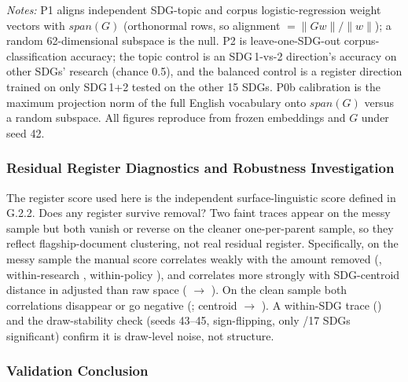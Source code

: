 \documentclass[12pt,a4paper]{article}
\begin{document}
\begin{table}[ht]
\centering
\small
\caption{Direction-space characterisation of the removed subspace $G$ (MPNet canon).}
\label{tab:register-subspace}
\resizebox{\textwidth}{!}{}
\par\smallskip\footnotesize\emph{Notes:} P1 aligns independent SDG-topic and corpus logistic-regression weight vectors with $span(G)$ (orthonormal rows, so alignment $=\lVert Gw\rVert/\lVert w\rVert$); a random 62-dimensional subspace is the null. P2 is leave-one-SDG-out corpus-classification accuracy; the topic control is an SDG\,1-vs-2 direction's accuracy on other SDGs' research (chance 0.5), and the balanced control is a register direction trained on only SDG\,1+2 tested on the other 15 SDGs. P0b calibration is the maximum projection norm of the full English vocabulary onto $span(G)$ versus a random subspace. All figures reproduce from frozen embeddings and $G$ under seed 42.\par
\end{table}

\subsubsection{Residual Register Diagnostics and Robustness Investigation}
\label{sec:regval-residual}

The register score used here is the independent surface-linguistic score defined in G.2.2. Does any register survive removal? Two faint traces appear on the messy sample but both vanish or reverse on the cleaner one-per-parent sample, so they reflect flagship-document clustering, not real residual register. Specifically, on the messy sample the manual score correlates weakly with the amount removed (\RegValTwoBOrigPooled{}, within-research \RegValTwoBOrigWithinRes{}, within-policy \RegValTwoBOrigWithinPol{}), and correlates more strongly with SDG-centroid distance in adjusted than raw space (\RegValTwoCOrigRaw{} $\to$ \RegValTwoCOrigAdj{}). On the clean sample both correlations disappear or go negative (\RegValTwoBOppPooled{}; centroid \RegValTwoCOppRaw{} $\to$ \RegValTwoCOppAdj{}). A within-SDG trace (\RegValOtherDistRho{}) and the draw-stability check (seeds 43--45, sign-flipping, only \RegValPerSdgSig{}/17 SDGs significant) confirm it is draw-level noise, not structure.

\subsubsection{Validation Conclusion}
\label{sec:regval-conclusion}
\end{document}
